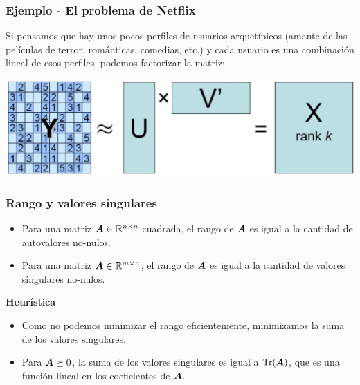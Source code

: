 \documentclass[aspectratio=169,12pt,spanish]{beamer}
\begin{document}
\begin{frame}
\frametitle{Ejemplo - El problema de Netflix}

Si pensamos que hay unos pocos perfiles de usuarios arquetípicos (amante de las películas de terror, románticas, comedias, etc.) y cada usuario es una combinación lineal de esos perfiles, podemos factorizar la matriz:

\begin{center}
\includegraphics[scale=.4]{rank_factorization.jpg}
\end{center}

\end{frame}


\begin{frame}
\frametitle{Rango y valores singulares}

\begin{itemize}
\item Para una matriz $\bm{A} \in \mathbb{R}^{n\times n}$ cuadrada, el rango de $\bm{A}$ es igual a la cantidad de autovalores no-nulos.
\item Para una matriz $\bm{A} \in \mathbb{R}^{m \times n}$, el rango de $\bm{A}$ es igual a la cantidad de valores singulares no-nulos.
\end{itemize}

\textbf{Heurística}
\begin{itemize}
\item Como no podemos minimizar el rango eficientemente, minimizamos la suma de los valores singulares.
\item Para $\bm{A} \succeq 0$, la suma de los valores singulares es igual a $\operatorname{Tr}(\bm{A})$, que es una función lineal en los coeficientes de $\bm{A}$.
\end{itemize}

\end{frame}

\end{document}
